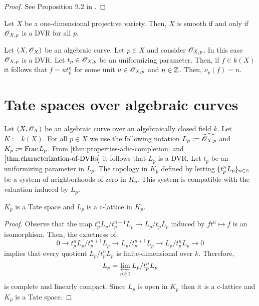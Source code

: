 \begin{proof}
	See Proposition 9.2 in \cite{atiyah}.
\end{proof}
\begin{corollary}\label{cor:smoothness-DVR-curves}
	Let $X$ be a one-dimensional projective variety. Then, $X$ is smooth if and only if ${\mathscr O}_{X,p}$ is a DVR for all $p$.
\end{corollary}
\begin{example}\label{ex:stalk-of-regular-functions-as-a-DVR}
	Let $(X,{\mathscr O}_{X})$ be an algebraic curve. Let $p \in X$ and consider ${\mathscr O}_{X,p}$. In this case ${\mathscr O}_{X,p}$ is a DVR. Let $t_{p}\in {\mathscr O}_{X,p}$ be an uniformizing parameter. Then, if $f \in k(X)$ it follows that $f = ut_{p}^{n}$ for some  unit $u\in {\mathscr O}_{X,p}$ and $n \in {\mathbb Z}$. Then, $\nu_{p}(f) = n$.
\end{example}
\section{Tate spaces over algebraic curves}
Let $(X,{\mathscr O}_{X})$ be an algebraic curve over an algebraically closed field $k$. Let $K := k(X)$. For all $p \in X$ we use the following notation $L_{p} := \widehat{{\mathscr O}_{X,p}}$ and $K_{p}:=\operatorname{Frac} L_{p}$. From \cref{thm:properties-adic-completion} and $\cref{thm:characterization-of-DVRs}$ it follows that $L_{p}$ is a DVR. Let $t_{p}$ be an uniformizing parameter in $L_{p}$. The topology in $K_{p}$ defined by letting $\{t_{p}^{n}L_{p}\}_{n\in {\mathbb Z}}$ be a system of neighborhoods of zero in $K_{p}$. This system is compatible with the valuation induced by $L_{p}$.
\begin{proposition}\label{prop:complete-fraction-field-is-a-Tate-space}
	$K_{p}$ is a Tate space and $L_{p}$ is a c-lattice in $K_{p}$.
\end{proposition}
\begin{proof}
	Observe that the map $t_{p}^{n}L_{p}/t_{p}^{n+1}L_{p} \to L_{p}/t_{p}L_{p}$ induced by $ft^{n}\mapsto f$ is an isomorphism. Then, the exactness of
	\[
		0 \to t_{p}^{n}L_{p}/t_{p}^{n+1}L_{p} \to L_{p}/t_{p}^{n+1}L_{p} \to L_{p}/t_{p}^{n}L_{p} \to 0
	\]
	implies that every quotient $L_{p}/t_{p}^{n}L_{p}$ is finite-dimensional over $k$. Therefore, 
	\[
		L_{p} = \varprojlim_{n\geq 1} L_{p}/t_{p}^{n}L_{p}
	\]
	is complete and linearly compact. Since $L_{p}$ is open in $K_{p}$ then it is a c-lattice and $K_{p}$ is a Tate space.
\end{proof}
